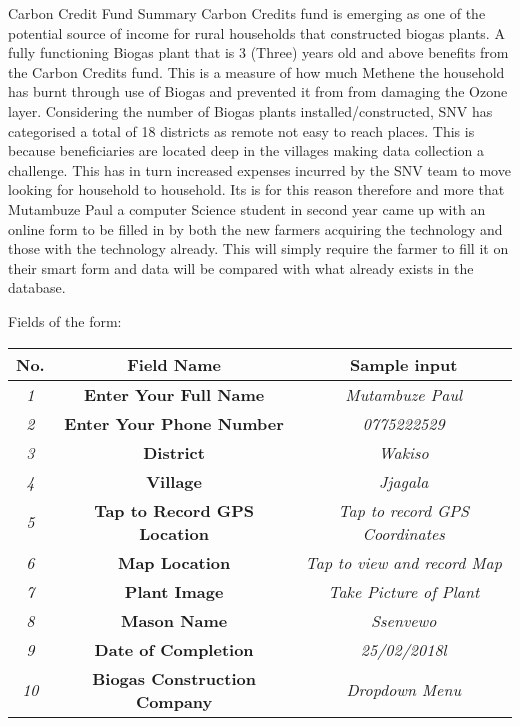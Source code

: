 \documentclass[12pt]{article}
\begin{document}
\begin{section}{Carbon Credit Fund Summary}\label{state} %
Carbon Credits fund is emerging as one of the potential source of income for rural households that constructed 
biogas plants.
A fully functioning Biogas plant that is 3 (Three) years old and above benefits from the Carbon Credits fund.
This is a measure of
how much Methene the household has burnt through use of Biogas and prevented it from from damaging the Ozone layer.
Considering the number of Biogas plants installed/constructed, SNV has categorised a total of 18 districts as 
remote not easy to reach 
places. This is because beneficiaries are located deep in the villages making data collection a challenge.
This has in turn increased 
expenses incurred by the SNV team to move looking for household to household. 
Its is for this reason therefore and more that Mutambuze Paul a computer Science student in
 second year came up with an online 
form to be filled in by both the new farmers acquiring the technology and those with the technology already.
This will simply require the farmer to fill it on their smart form and data will be compared with what already exists
in the database. 

\end{section}

\begin{section}{Fields of the form:}\label{state} %
\end{section}

\begin{tabular}{|c|c|c|}
\hline
\textbf{No.}& \textbf{Field Name} & \textbf{Sample input} \\ \hline
\textit{1}&\textbf{Enter Your Full Name} & \textit{Mutambuze Paul} \\ \hline 
\textit{2}&\textbf{Enter Your Phone Number} & \textit{0775222529} \\ \hline 
\textit{3}&\textbf{District} & \textit{Wakiso}\\ \hline 
\textit{4}&\textbf{Village} & \textit{Jjagala}\\ \hline 
\textit{5}&\textbf{Tap to Record GPS Location} & \textit{Tap to record GPS Coordinates}\\ \hline 
\textit{6}&\textbf{Map Location} & \textit{Tap to view and record Map} \\ \hline 
\textit{7}&\textbf{Plant Image} & \textit{Take Picture of Plant}\\ \hline 
\textit{8}&\textbf{Mason Name} & \textit{Ssenvewo}\\ \hline 
\textit{9}&\textbf{Date of Completion} & \textit{25/02/2018l} \\ \hline 
\textit{10}&\textbf{Biogas Construction Company} & \textit{Dropdown Menu}\\ 
 \hline
\end{tabular}
\end{document}
